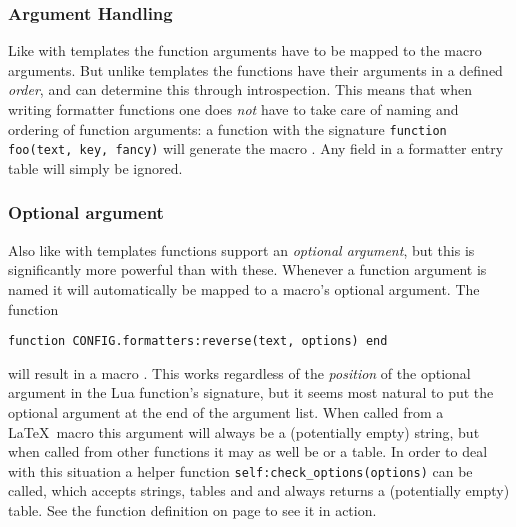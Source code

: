 \documentclass{scrartcl}
\begin{document}
\subsubsection{Argument Handling}
\label{sec:functions-argument-handling}

Like with templates the function arguments have to be mapped to the macro
arguments. But unlike templates the functions have their arguments in a defined
\emph{order}, and  can determine this through
introspection.  This means that when writing formatter functions one does
\emph{not} have to take care of naming and ordering of function arguments: a
function with the signature \texttt{function foo(text, key, fancy)}
will generate the macro \texttt{}.  Any
 field in a formatter entry table will simply be ignored.


\subsubsection{Optional argument}
\label{sec:functions-optional-argument}

Also like with templates functions support an \emph{optional argument}, but this
is significantly more powerful than with these.  Whenever a function argument is
named  it will automatically be mapped to a macro's optional
argument.  The function

\begin{verbatim}
function CONFIG.formatters:reverse(text, options) end
\end{verbatim}

\noindent will result in a macro \texttt{}. This
works regardless of the \emph{position} of the optional argument in the Lua
function's signature, but it seems most natural to put the optional argument at
the end of the argument list.  When called from a \LaTeX\ macro this argument
will always be a (potentially empty) string, but when called from other
functions it may as well be  or a table.  In order to deal with this
situation a helper function \texttt{self:check_options(options)} can be
called, which accepts strings, tables and  and always returns a
(potentially empty) table.  See the function definition on page
\pageref{code:function} to see it in action.
\end{document}
